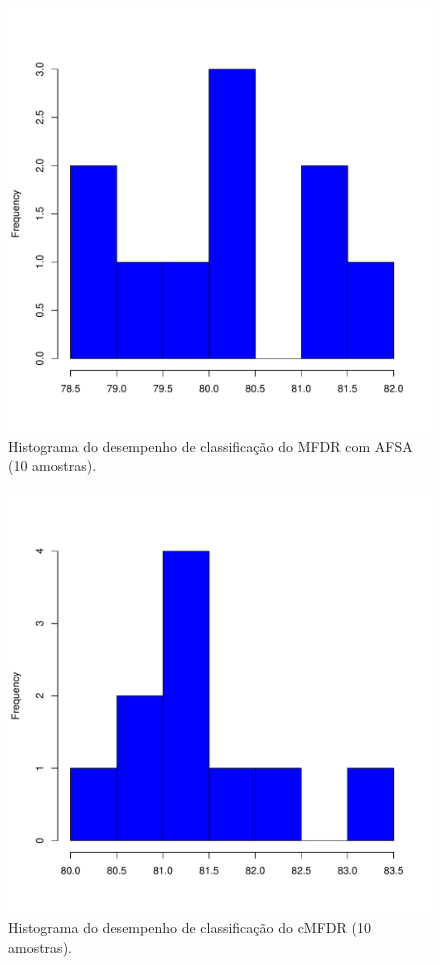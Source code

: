 \documentclass[conference]{IEEEtran}
\begin{document}
\begin{figure}[h]
	\centering
	\includegraphics[width=\linewidth]{img/bluehist_afsa_mfdr.pdf}
	\caption{Histograma do desempenho de classificação do MFDR com AFSA (10 amostras).}
	\label{fig:hist_afsa_mfdr}
\end{figure}

\begin{figure}[h]
	\centering
	\includegraphics[width=\linewidth]{img/bluehist_cmfdr.pdf}
	\caption{Histograma do desempenho de classificação do cMFDR (10 amostras).}
	\label{fig:hist_cmfdr}
\end{figure}
\end{document}
